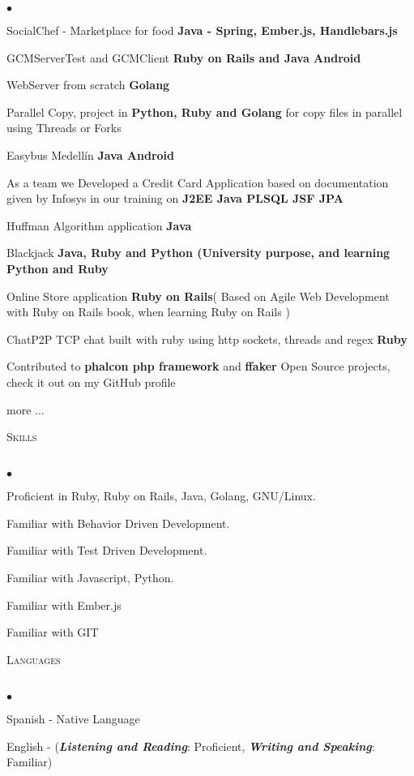 \documentclass[a4paper]{article}
\newcommand{\lineunder}{\vspace*{-8pt} \\ \hspace*{-18pt} \hrulefill \\}
\newcommand{\header}[1]{{\hspace*{-15pt}\vspace*{6pt}
\textsc{#1}} \vspace*{-6pt} \lineunder}
\newenvironment{achievements}{\begin{list}{$\bullet$}{\topsep 0pt \itemsep
-2pt}}{\vspace*{4pt}\end{list}}
\newcommand{\programming}[1]{{\textbf{#1}}}
\newcommand{\emphasys}[1]{\textbf{\emph{#1}}}
\begin{document}
\begin{achievements}
\item{SocialChef - Marketplace for food} \programming{Java - Spring, Ember.js, Handlebars.js}
\item{GCMServerTest and GCMClient} \programming{Ruby on Rails and Java Android}
\item{WebServer from scratch} \programming{Golang}
\item{Parallel Copy, project in \programming{Python, Ruby and Golang} for copy files in parallel using Threads or Forks}
\item{Easybus Medell\'in }\programming{Java Android}
\item{As a team we Developed a Credit Card Application based on documentation given by Infosys in our training on \programming{J2EE Java PLSQL JSF JPA}}
\item{Huffman Algorithm application \programming{Java}}
\item{Blackjack \programming{Java, Ruby and Python (University purpose, and learning Python and Ruby}}
\item{Online Store application \programming{Ruby on Rails}( Based on Agile Web Development with Ruby on Rails book, when learning Ruby on Rails )}
\item{ChatP2P TCP chat built with ruby using http sockets, threads and regex \programming{Ruby}}
\item{Contributed to \programming{phalcon php framework} and \programming{ffaker} Open Source projects, check it out on my GitHub profile}
\item{more ...}
\end{achievements}
\newpage
\header{Skills}
\begin{achievements}
\item {Proficient in Ruby, Ruby on Rails, Java, Golang, GNU/Linux.}
\item {Familiar with Behavior Driven Development.}
\item {Familiar with Test Driven Development.}
\item {Familiar with Javascript, Python.}
\item {Familiar with Ember.js}
\item {Familiar with GIT}
\end{achievements}
\header{Languages}
\begin{achievements}
\item{Spanish - Native Language}
\item{English - (\emphasys{Listening and Reading}: Proficient, \emphasys{Writing and Speaking}: Familiar)}
\end{achievements}
\end{document}
